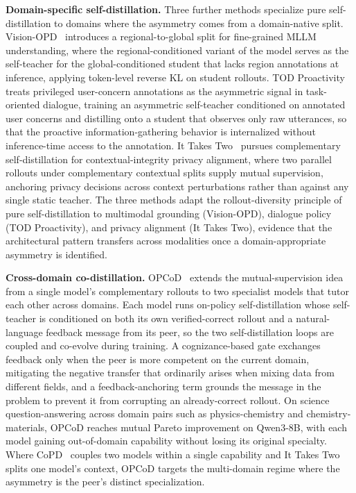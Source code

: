 \documentclass{article} %
\begin{document}
\textbf{Domain-specific self-distillation.} Three further methods specialize pure self-distillation to domains where the asymmetry comes from a domain-native split. Vision-OPD~\citep{2605.18740} introduces a regional-to-global split for fine-grained MLLM understanding, where the regional-conditioned variant of the model serves as the self-teacher for the global-conditioned student that lacks region annotations at inference, applying token-level reverse KL on student rollouts. TOD Proactivity~\citep{2605.22240} treats privileged user-concern annotations as the asymmetric signal in task-oriented dialogue, training an asymmetric self-teacher conditioned on annotated user concerns and distilling onto a student that observes only raw utterances, so that the proactive information-gathering behavior is internalized without inference-time access to the annotation. It Takes Two~\citep{2605.20258} pursues complementary self-distillation for contextual-integrity privacy alignment, where two parallel rollouts under complementary contextual splits supply mutual supervision, anchoring privacy decisions across context perturbations rather than against any single static teacher. The three methods adapt the rollout-diversity principle of pure self-distillation to multimodal grounding (Vision-OPD), dialogue policy (TOD Proactivity), and privacy alignment (It Takes Two), evidence that the architectural pattern transfers across modalities once a domain-appropriate asymmetry is identified.

\textbf{Cross-domain co-distillation.} OPCoD~\citep{2606.14368} extends the mutual-supervision idea from a single model's complementary rollouts to two specialist models that tutor each other across domains. Each model runs on-policy self-distillation whose self-teacher is conditioned on both its own verified-correct rollout and a natural-language feedback message from its peer, so the two self-distillation loops are coupled and co-evolve during training. A cognizance-based gate exchanges feedback only when the peer is more competent on the current domain, mitigating the negative transfer that ordinarily arises when mixing data from different fields, and a feedback-anchoring term grounds the message in the problem to prevent it from corrupting an already-correct rollout. On science question-answering across domain pairs such as physics-chemistry and chemistry-materials, OPCoD reaches mutual Pareto improvement on Qwen3-8B, with each model gaining out-of-domain capability without losing its original specialty. Where CoPD~\citep{2604.27083} couples two models within a single capability and It Takes Two splits one model's context, OPCoD targets the multi-domain regime where the asymmetry is the peer's distinct specialization.
\end{document}
